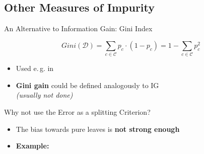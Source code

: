 \subsection{Other Measures of Impurity}

\begin{frame}{An Alternative to Information Gain: Gini Index}{}
	\begin{boxBlueNoFrame}
		\begin{equation}
			Gini(\mathcal{D})
				= \sum_{c \in \mathcal{C}} p_c \cdot (1 - p_c)
				= 1 -  \sum_{c \in \mathcal{C}} p_c^2
		\end{equation}
	\end{boxBlueNoFrame}
	\begin{itemize}
		\item Used e.\,g. in 
		\item \textbf{Gini gain} could be defined analogously to IG \\
			{\footnotesize \textit{(usually not done)}}
	\end{itemize}
\end{frame}


\begin{frame}{Why not use the Error as a splitting Criterion?}{}
	\begin{itemize}
		\item The bias towards pure leaves is \textbf{not strong enough}
		\item \textbf{Example:}
	\end{itemize}
	
\end{frame}


